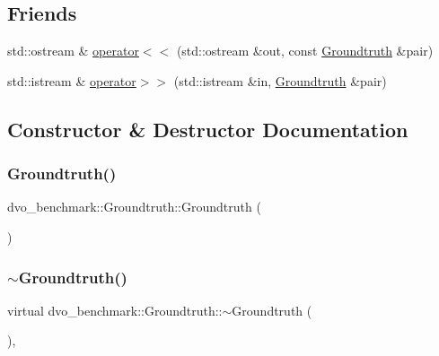 \subsection*{Friends}
\begin{DoxyCompactItemize}
\item 
std\+::ostream \& \mbox{\hyperlink{classdvo__benchmark_1_1_groundtruth_a253b88524b96be5898ba1b657cda2f9a}{operator$<$$<$}} (std\+::ostream \&out, const \mbox{\hyperlink{classdvo__benchmark_1_1_groundtruth}{Groundtruth}} \&pair)
\item 
std\+::istream \& \mbox{\hyperlink{classdvo__benchmark_1_1_groundtruth_a2ce119ce35748a3d57ec0d36499c44e1}{operator$>$$>$}} (std\+::istream \&in, \mbox{\hyperlink{classdvo__benchmark_1_1_groundtruth}{Groundtruth}} \&pair)
\end{DoxyCompactItemize}


\subsection{Constructor \& Destructor Documentation}
\mbox{\label{classdvo__benchmark_1_1_groundtruth_adb2acf16f7f0a87f92db5e74876e4f2e}} 
\subsubsection{\texorpdfstring{Groundtruth()}{Groundtruth()}}
{\footnotesize\ttfamily dvo\+\_\+benchmark\+::\+Groundtruth\+::\+Groundtruth (\begin{DoxyParamCaption}{ }\end{DoxyParamCaption})\hspace{0.3cm}{\ttfamily [inline]}}

\mbox{\label{classdvo__benchmark_1_1_groundtruth_a650239cd5e1ca8fa434e5121e7c4d727}} 
\subsubsection{\texorpdfstring{$\sim$\+Groundtruth()}{~Groundtruth()}}
{\footnotesize\ttfamily virtual dvo\+\_\+benchmark\+::\+Groundtruth\+::$\sim$\+Groundtruth (\begin{DoxyParamCaption}{ }\end{DoxyParamCaption})\hspace{0.3cm}{\ttfamily [inline]}, {\ttfamily [virtual]}}



